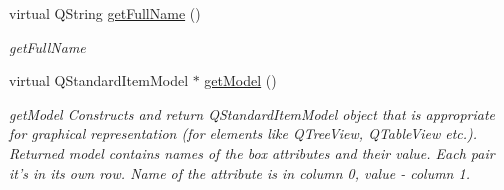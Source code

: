 \begin{DoxyCompactItemize}
\item 
virtual Q\-String \hyperlink{class_visual_sample_entry_a8c48b121f4b5bb48d33bc9988a5dd856}{get\-Full\-Name} ()
\begin{DoxyCompactList}\small\item\em get\-Full\-Name \end{DoxyCompactList}\item 
virtual Q\-Standard\-Item\-Model $\ast$ \hyperlink{class_visual_sample_entry_a475b074b66ad025a76c66888c0e24f46}{get\-Model} ()
\begin{DoxyCompactList}\small\item\em get\-Model Constructs and return Q\-Standard\-Item\-Model object that is appropriate for graphical representation (for elements like Q\-Tree\-View, Q\-Table\-View etc.). Returned model contains names of the box attributes and their value. Each pair it's in its own row. Name of the attribute is in column 0, value -\/ column 1. \end{DoxyCompactList}\end{DoxyCompactItemize}
